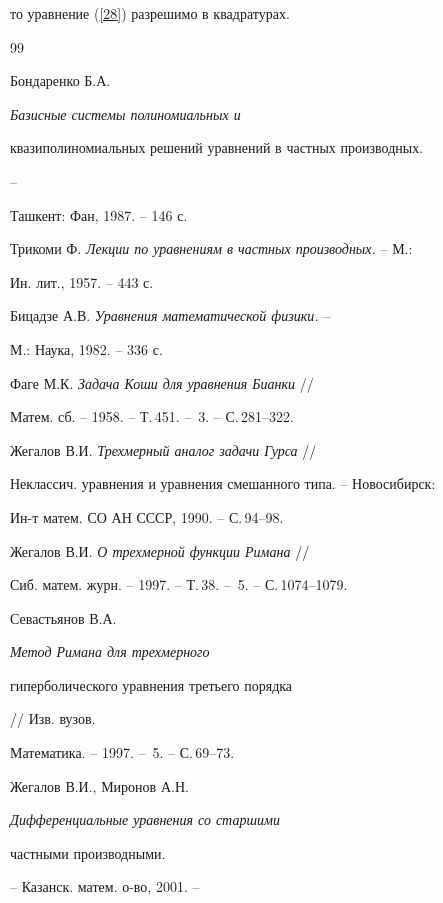 то уравнение (\ref{28}) разрешимо в квадратурах.








\begin{thebibliography}{99}







Бондаренко Б.А. {\it Базисные системы полиномиальных и


квазиполиномиальных решений уравнений в частных производных.} --


Ташкент: Фан, 1987. -- 146 с.




Трикоми Ф. {\it Лекции по уравнениям в частных производных.} -- М.:


Ин. лит., 1957. -- 443 с.




Бицадзе А.В. {\it Уравнения математической физики.} --


М.: Наука, 1982. -- 336 с.




Фаге М.К. {\it Задача Коши для уравнения Бианки} //


Матем. сб. -- 1958. -- Т.\,451. -- \No\,3. -- С.\,281--322.




Жегалов В.И. {\it Трехмерный аналог задачи Гурса} //


Неклассич. уравнения и уравнения смешанного типа. -- Новосибирск:


Ин-т матем. СО АН СССР, 1990. -- С.\,94--98.




Жегалов В.И. {\it О трехмерной функции Римана} //


Сиб. матем. журн. -- 1997. -- Т.\,38. -- \No\,5. -- С.\,1074--1079.




Севастьянов В.А. {\it Метод Римана для трехмерного


гиперболического уравнения третьего порядка} // Изв. вузов.


Математика. -- 1997. -- \No\,5. -- С.\,69--73.




Жегалов В.И., Миронов А.Н. {\it Дифференциальные уравнения со старшими


частными производными.} -- Казанск. матем. о-во, 2001. --



\end{thebibliography}
